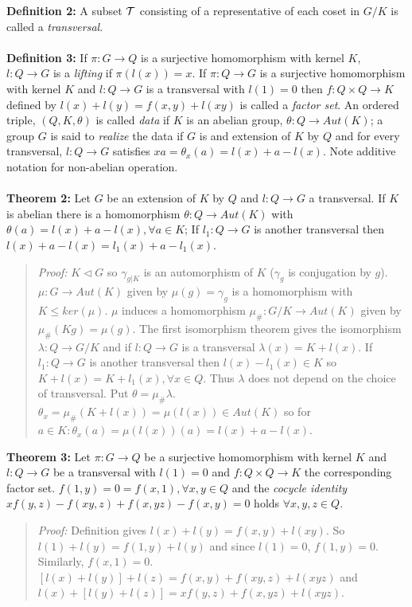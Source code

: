 {\bf Definition 2:}
A subset ${\cal T}$ consisting of a representative of each coset
in $G/K$ is called a \emph{transversal}. 
\\
\\
{\bf Definition 3:}
If $\pi: G \rightarrow Q$ is a surjective homomorphism with kernel
$K$, $l: Q \rightarrow G$ is a \emph{lifting} if $\pi(l(x))=x$.
If $\pi: Q \rightarrow G$ is a surjective homomorphism with
kernel $K$ and $l:Q \rightarrow G$ is a transversal with $l(1)=0$ then
$f: Q \times Q \rightarrow K$ defined by $l(x)+l(y)= f(x,y) + l(xy)$ is
called a \emph{factor set}.  An ordered triple, $(Q, K, \theta)$ is called \emph{data}
if $K$ is an abelian group, $\theta: Q \rightarrow Aut(K)$; a group $G$ is said to
\emph{realize} the data if $G$ is and extension of $K$ by $Q$ and for every transversal,
$l: Q \rightarrow G$ satisfies $xa = \theta_x(a)
= l(x) +a-l(x)$.  Note additive notation for non-abelian operation.
\\
\\
{\bf Theorem 2:}
Let $G$ be an extension of $K$ by $Q$ and
$l: Q \rightarrow G$ a transversal.  If $K$ is abelian there is a homomorphism
$\theta: Q \rightarrow Aut(K)$ with $\theta(a)= l(x)+a-l(x), \forall a \in K$;
If $l_1: Q \rightarrow G$ is another transversal then
$ l(x)+a-l(x)= l_1(x)+a-l_1(x)$.
\begin{quote}
\emph{Proof:} 
$K \lhd G$ so $\gamma_{g|K}$ is an automorphism of $K$ ($\gamma_g$ is conjugation by $g$).
$\mu: G \rightarrow Aut(K)$ given by $\mu(g)= \gamma_g$ is a homomorphism with
$K \leq ker(\mu)$.  $\mu$ induces a homomorphism $\mu_{\#}: G/K \rightarrow Aut(K)$ given by
$\mu_{\#}(Kg)= \mu(g)$.
The first isomorphism theorem gives the isomorphism $\lambda: Q \rightarrow G/K$ and if
$l:Q \rightarrow G$ is a transversal $\lambda(x)=K+l(x)$.
If $l_1: Q \rightarrow G$ is another transversal then $l(x) - l_1(x) \in K$ so
$ K+l(x)= K+l_1(x), \forall x \in Q $.  Thus $\lambda$ does not depend on the choice of transversal.
Put $\theta= \mu_{\#} \lambda$.  $\theta_x = \mu_{\#}(K+l(x))= \mu(l(x)) \in Aut(K)$ so for $a \in K:
\theta_x(a)= \mu(l(x))(a)= l(x)+a-l(x)$.
\end{quote}
{\bf Theorem 3:}
Let $\pi: G \rightarrow Q$ be a surjective homomorphism with kernel $K$ and
$l:Q \rightarrow G$ be a transversal with $l(1)=0$ and $f: Q \times Q \rightarrow K$ the corresponding
factor set.  $f(1,y)=0=f(x,1), \forall x,y \in Q$ and 
the \emph{cocycle identity} $xf(y,z)-f(xy,z)+f(x,yz)-f(x,y)=0$ holds $\forall x,y,z \in Q$.
\begin{quote}
\emph{Proof:}  
Definition gives $l(x)+l(y)= f(x,y)+l(xy)$.
So $l(1)+l(y)= f(1,y)+l(y)$ and since $l(1)=0$, $f(1,y)= 0$.  Similarly, $f(x,1)=0$.
$[l(x)+l(y)]+l(z)= f(x,y)+f(xy,z)+l(xyz)$ and
$l(x)+[l(y)+l(z)]= xf(y,z)+f(x,yz)+l(xyz)$.
\end{quote}
